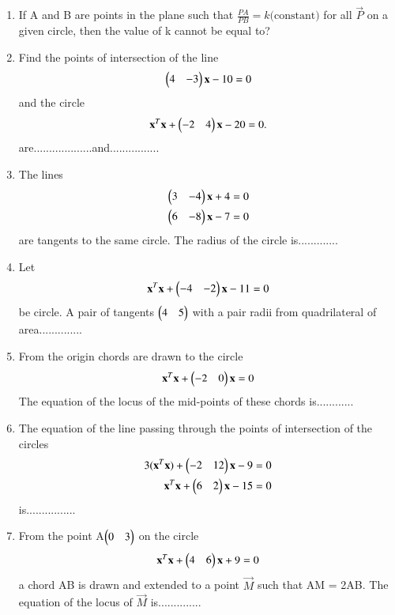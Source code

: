 \renewcommand{\theequation}{\theenumi}
\begin{enumerate}[label=\arabic*.,ref=\thesubsection.\theenumi]
\item If A and B are points in the plane such that $\frac{PA}{PB} = k\text{(constant)}$ for all $\vec{P}$ on a given circle, then the value of k cannot be equal to?
 
\item Find the points of intersection of the line 
\begin{align} 
\begin{pmatrix}4 & -3\end{pmatrix}\mathbf{x} - 10 = 0
\end{align} 
and the circle 
\begin{align}
\mathbf {x}^T\mathbf{x} + \begin{pmatrix}-2 & 4\end{pmatrix}\mathbf{x} - 20 = 0.
\end{align}
are...................and................

\item The lines 
\begin{align}
\begin{pmatrix}3 & -4\end{pmatrix}\mathbf{x} + 4 = 0 \\
\begin{pmatrix}6 & -8\end{pmatrix}\mathbf{x} - 7 = 0
\end{align} 
are tangents to the same circle. The radius of the circle is.............

\item Let 
\begin{align}
\mathbf{x}^T \mathbf{x} + \begin{pmatrix}-4 & -2\end{pmatrix}\mathbf{x} - 11 = 0
\end{align} 
be circle. A pair of tangents $\begin{pmatrix}4 & 5\end{pmatrix}$ with a pair radii from quadrilateral of area..............

\item From the origin chords are drawn to the circle 
\begin{align}
\mathbf{x}^T\mathbf{x} + \begin{pmatrix}-2 & 0\end{pmatrix}\mathbf{x} = 0
\end{align} 
The equation of the locus of the mid-points of these chords is............

\item The equation of the line passing through the points of intersection of the circles 
\begin{align}
3(\mathbf{x}^T\mathbf{x}) + \begin{pmatrix}-2 & 12\end{pmatrix}\mathbf{x} - 9 = 0 \\
\mathbf{x}^T\mathbf{x} + \begin{pmatrix}6 & 2\end{pmatrix}\mathbf{x} - 15 = 0
\end{align} 
is................

\item From the point A$\begin{pmatrix}0 & 3\end{pmatrix}$ on the circle 
\begin{align}
\mathbf{x}^T\mathbf{x} + \begin{pmatrix}4 & 6\end{pmatrix}\mathbf{x} + 9 = 0
\end{align} 
a chord AB is drawn and extended to a point $\vec{M}$ such that AM = 2AB. The equation of the locus of 
$\vec{M}$ is..............


\end{enumerate}
